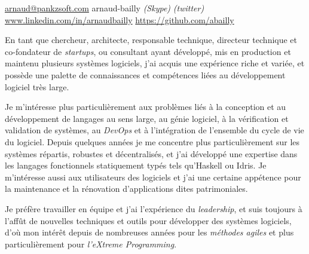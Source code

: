 \documentclass[12pt,a4paper]{article}
\begin{document}
\sloppy


\noindent\href{mailto:arnaud.at.pankzsoft.dot.com}{arnaud\mbox{}@\mbox{}pankzsoft.com}\sbull
{\newnums arnaud-bailly} \emph{(Skype)} \emph{(twitter)}\sbull
\href{http://www.linkedin.com/in/arnaudbailly}{www.linkedin.com/in/arnaudbailly} \sbull
\href{https://github.com/abailly}{https://github.com/abailly} \\

\spacedhrule{0.9em}{-0.4em}  %


\begin{multicols}{2}  %
  En tant que chercheur, architecte, responsable technique, directeur technique et co-fondateur de \emph{startups}, ou consultant ayant développé, mis en production et maintenu plusieurs systèmes logiciels, j'ai acquis une expérience riche et variée, et possède une palette de connaissances et compétences liées au développement logiciel très large.

  Je m'intéresse plus particulièrement aux problèmes liés à la conception et au développement de langages au sens large, au génie logiciel, à la vérification et validation de systèmes, au \emph{DevOps} et à l'intégration de l'ensemble du cycle de vie du logiciel. Depuis quelques années je me concentre plus particulièrement sur les systèmes répartis, robustes et décentralisés, et j'ai développé une expertise dans les langages fonctionnels statiquement typés tels qu'Haskell ou Idris. Je m'intéresse aussi aux utilisateurs des logiciels et j'ai une certaine appétence pour la maintenance et la rénovation d'applications dites patrimoniales.

  Je préfère travailler en équipe et j'ai l'expérience du \emph{leadership}, et suis toujours à l'affût de nouvelles techniques et outils pour développer des systèmes logiciels, d'où mon intérêt depuis de nombreuses années pour les \emph{méthodes agiles} et plus particulièrement pour \emph{l'eXtreme Programming}.
\end{multicols}


\end{document}
